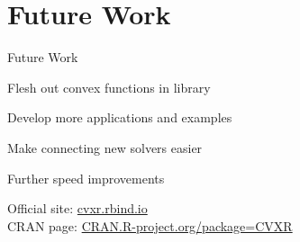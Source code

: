 \documentclass{beamer}
\begin{document}
\section{Future Work}
\begin{frame}{Future Work}
	\BIT
		\item Flesh out convex functions in library
		\item Develop more applications and examples
		\item Make connecting new solvers easier
		\item Further speed improvements
	\EIT
	
	Official site: \url{cvxr.rbind.io} \\
	CRAN page: \url{CRAN.R-project.org/package=CVXR}
\end{frame}
\end{document}
